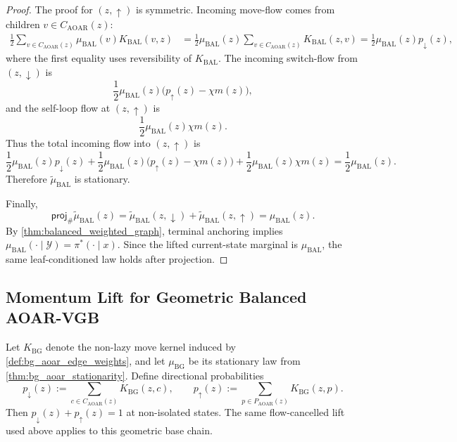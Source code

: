 \documentclass{article}
\numberwithin{theorem}{section}
\numberwithin{proposition}{section}
\numberwithin{corollary}{section}
\numberwithin{lemma}{section}
\numberwithin{conjecture}{section}
\numberwithin{remark}{section}
\numberwithin{definition}{section}
\numberwithin{assumption}{section}
\numberwithin{example}{section}
\newcommand{\calY}{{\mathcal{Y}}}
\begin{document}
\begin{proof}
The proof for $(z,\uparrow)$ is symmetric. Incoming move-flow comes from children $v\in C_{\mathrm{AOAR}}(z)$:
\begin{align*}
    \frac12\sum_{v\in C_{\mathrm{AOAR}}(z)}\mu_{\mathrm{BAL}}(v)K_{\mathrm{BAL}}(v,z)
    &=
    \frac12\mu_{\mathrm{BAL}}(z)\sum_{v\in C_{\mathrm{AOAR}}(z)}K_{\mathrm{BAL}}(z,v)=
    \frac12\mu_{\mathrm{BAL}}(z)p_{\downarrow}(z),
\end{align*}
where the first equality uses reversibility of $K_{\mathrm{BAL}}$. The incoming switch-flow from $(z,\downarrow)$ is
\begin{equation*}
    \frac12\mu_{\mathrm{BAL}}(z)\bigl(p_{\uparrow}(z)-\chi m(z)\bigr),
\end{equation*}
and the self-loop flow at $(z,\uparrow)$ is
\begin{equation*}
    \frac12\mu_{\mathrm{BAL}}(z)\chi m(z).
\end{equation*}
Thus the total incoming flow into $(z,\uparrow)$ is
\begin{equation*}
    \frac12\mu_{\mathrm{BAL}}(z)p_{\downarrow}(z)
    +\frac12\mu_{\mathrm{BAL}}(z)\bigl(p_{\uparrow}(z)-\chi m(z)\bigr)
    +\frac12\mu_{\mathrm{BAL}}(z)\chi m(z)
    =
    \frac12\mu_{\mathrm{BAL}}(z).
\end{equation*}
Therefore $\widetilde\mu_{\mathrm{BAL}}$ is stationary.

Finally,
\begin{equation*}
    \textsf{proj}_{\#}\widetilde\mu_{\mathrm{BAL}}(z)
    =
    \widetilde\mu_{\mathrm{BAL}}(z,\downarrow)+\widetilde\mu_{\mathrm{BAL}}(z,\uparrow)
    =
    \mu_{\mathrm{BAL}}(z).
\end{equation*}
By \cref{thm:balanced_weighted_graph}, terminal anchoring implies $\mu_{\mathrm{BAL}}(\cdot\mid\calY)=\pi^*(\cdot\mid x)$. Since the lifted current-state marginal is $\mu_{\mathrm{BAL}}$, the same leaf-conditioned law holds after projection.
\end{proof}

\subsection{Momentum Lift for Geometric Balanced AOAR-VGB}
\label{app:subsec:momentum_bg_aoar_vgb}

Let $K_{\mathrm{BG}}$ denote the non-lazy move kernel induced by \cref{def:bg_aoar_edge_weights}, and let $\mu_{\mathrm{BG}}$ be its stationary law from \cref{thm:bg_aoar_stationarity}. Define directional probabilities
\begin{equation*}
    p_{\downarrow}(z):=\sum_{c\in C_{\mathrm{AOAR}}(z)}K_{\mathrm{BG}}(z,c),
    \qquad
    p_{\uparrow}(z):=\sum_{p\in P_{\mathrm{AOAR}}(z)}K_{\mathrm{BG}}(z,p).
\end{equation*}
Then $p_{\downarrow}(z)+p_{\uparrow}(z)=1$ at non-isolated states. The same flow-cancelled lift used above applies to this geometric base chain.
\end{document}
